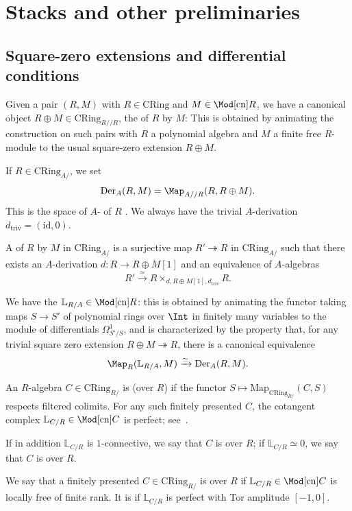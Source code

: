 \documentclass[10pt]{amsart}
\begin{document}
\section{Stacks and other preliminaries}
\label{sec:prelim}

\subsection{Square-zero extensions and differential conditions}
\label{subsec:square_zero}

Given a pair $(R,M)$ with $R\in \mathrm{CRing}$ and $M\in \Mod[\mathrm{cn}]{R}$, we have a canonical object $R\oplus M\in \mathrm{CRing}_{R/{}/R}$, the  of $R$ by $M$: This is obtained by animating the construction on such pairs with $R$ a polynomial algebra and $M$ a finite free $R$-module to the usual square-zero extension $R\oplus M$.

If $R\in \mathrm{CRing}_{A/}$, we set
\[
\mathrm{Der}_A(R,M) = \Map_{A/{}/R}(R,R\oplus M).
\]
This is the space of $A$- of $R$ . We always have the trivial $A$-derivation $d_{\mathrm{triv}} = (\mathrm{id},0)$.

A  of $R$ by $M$ in $\mathrm{CRing}_{A/}$ is a surjective map $R'\twoheadrightarrow R$ in $\mathrm{CRing}_{A/}$ such that there exists an $A$-derivation $d:R\to R\oplus M[1]$ and an equivalence of $A$-algebras
\[
R' \xrightarrow{\simeq} R\times_{d,R\oplus M[1],d_{\mathrm{triv}}}R.
\]


We have the  $\mathbb{L}_{R/A}\in \Mod[\mathrm{cn}]{R}$: this is obtained by animating the functor taking maps $S\to S'$ of polynomial rings over $\Int$ in finitely many variables to the module of differentials $\Omega^1_{S'/S}$, and is characterized by the property that, for any trivial square zero extension $R\oplus M\twoheadrightarrow R$, there is a canonical equivalence
\[
\Map_{{R}}(\mathbb{L}_{R/A},M)\xrightarrow{\simeq}\mathrm{Der}_A(R,M).
\]


\begin{definition}\label{defn:differential_conditions}
An $R$-algebra $C\in \mathrm{CRing}_{R/}$ is  (over $R$) if the functor $S\mapsto \mathrm{Map}_{\mathrm{CRing}_{R/}}(C,S)$ respects filtered colimits. For any such finitely presented $C$, the cotangent complex $\mathbb{L}_{C/R}\in \Mod[\mathrm{cn}]{C}$ is perfect; see~\cite[(17.4.3.18)]{Lurie2017-oh}.

If in addition $\mathbb{L}_{C/R}$ is $1$-connective, we say that $C$ is  over $R$; if $\mathbb{L}_{C/R}\simeq 0$, we say that $C$ is  over $R$.

We say that a finitely presented $C\in \mathrm{CRing}_{R/}$ is  over $R$ if $\mathbb{L}_{C/R}\in \Mod[\mathrm{cn}]{C}$ is locally free of finite rank. It is  if $\mathbb{L}_{C/R}$ is perfect with Tor amplitude $[-1,0]$.
\end{definition}
\end{document}
